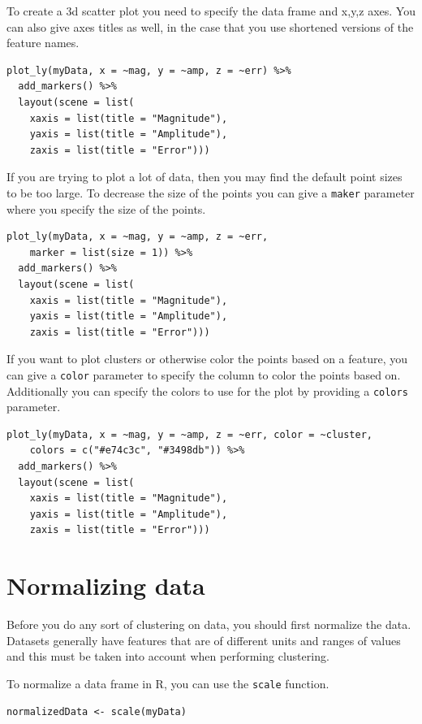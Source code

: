 To create a 3d scatter plot you need to specify the data frame and x,y,z axes. You can also give axes titles as well, in the case that you use shortened versions of the feature names.

\begin{verbatim}
plot_ly(myData, x = ~mag, y = ~amp, z = ~err) %>%
  add_markers() %>%
  layout(scene = list(
    xaxis = list(title = "Magnitude"),
    yaxis = list(title = "Amplitude"),
    zaxis = list(title = "Error")))
\end{verbatim}

If you are trying to plot a lot of data, then you may find the default point sizes to be too large. To decrease the size of the points you can give a \verb|maker| parameter where you specify the size of the points.

\begin{verbatim}
plot_ly(myData, x = ~mag, y = ~amp, z = ~err,
    marker = list(size = 1)) %>%
  add_markers() %>%
  layout(scene = list(
    xaxis = list(title = "Magnitude"),
    yaxis = list(title = "Amplitude"),
    zaxis = list(title = "Error")))
\end{verbatim}

If you want to plot clusters or otherwise color the points based on a feature, you can give a \verb|color| parameter to specify the column to color the points based on. Additionally you can specify the colors to use for the plot by providing a \verb|colors| parameter.

\begin{verbatim}
plot_ly(myData, x = ~mag, y = ~amp, z = ~err, color = ~cluster,
    colors = c("#e74c3c", "#3498db")) %>%
  add_markers() %>%
  layout(scene = list(
    xaxis = list(title = "Magnitude"),
    yaxis = list(title = "Amplitude"),
    zaxis = list(title = "Error")))
\end{verbatim}

\section{Normalizing data}
Before you do any sort of clustering on data, you should first normalize the data. Datasets generally have features that are of different units and ranges of values and this must be taken into account when performing clustering.

To normalize a data frame in R, you can use the \verb|scale| function.

\begin{verbatim}
normalizedData <- scale(myData)
\end{verbatim}


